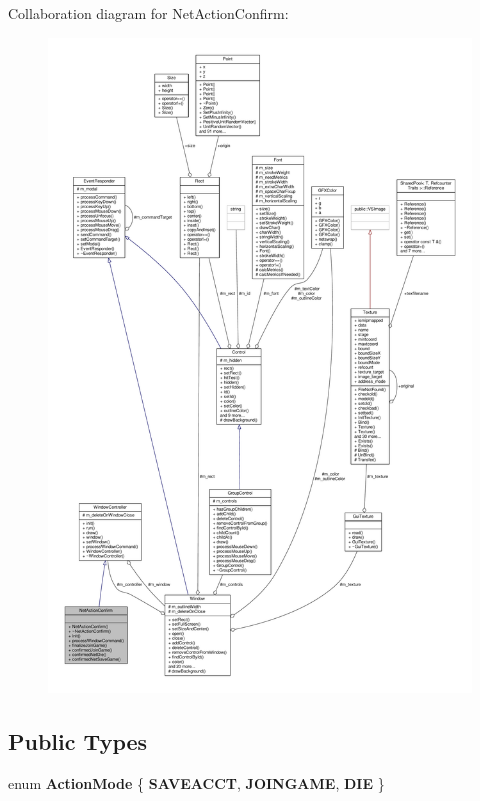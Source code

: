 Collaboration diagram for Net\+Action\+Confirm\+:
\nopagebreak
\begin{figure}[H]
\begin{center}
\leavevmode
\includegraphics[width=350pt]{d5/d34/classNetActionConfirm__coll__graph}
\end{center}
\end{figure}
\subsection*{Public Types}
\begin{DoxyCompactItemize}
\item 
enum {\bfseries Action\+Mode} \{ {\bfseries S\+A\+V\+E\+A\+C\+CT}, 
{\bfseries J\+O\+I\+N\+G\+A\+ME}, 
{\bfseries D\+IE}
 \}\hypertarget{classNetActionConfirm_a308b5fda1e0b07ad5552f25be94539ae}{}\label{classNetActionConfirm_a308b5fda1e0b07ad5552f25be94539ae}

\end{DoxyCompactItemize}
